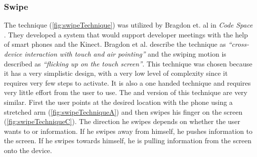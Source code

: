 \subsubsection{Swipe} \label{sec:swipeTechnique}
The \swipe technique (\cref{fig:swipeTechnique}) was utilized by Bragdon et. al in \emph{Code Space} \cite{Bragdon:2011}.
They developed a system that would support developer meetings with the help of smart phones and the Kinect. 
Bragdon et al. describe the technique as \emph{``cross-device interaction with touch and air pointing''} and the swiping motion is described as \emph{``flicking up on the touch screen''}.
This technique was chosen because it has a very simplistic design, with a very low level of complexity since it requires very few steps to activate.
It is also a one handed technique and requires very little effort from the user to use.
The \push and \pull version of this technique are very similar.
First the user points at the desired location with the phone using a stretched arm (\cref{fig:swipeTechniqueA}) and then swipes his finger on the screen (\cref{fig:swipeTechniqueC}).
The direction he swipes depends on whether the user wants to \push or \pull information.
If he swipes away from himself, he pushes information to the screen.
If he swipes towards himself, he is pulling information from the screen onto the device.  

